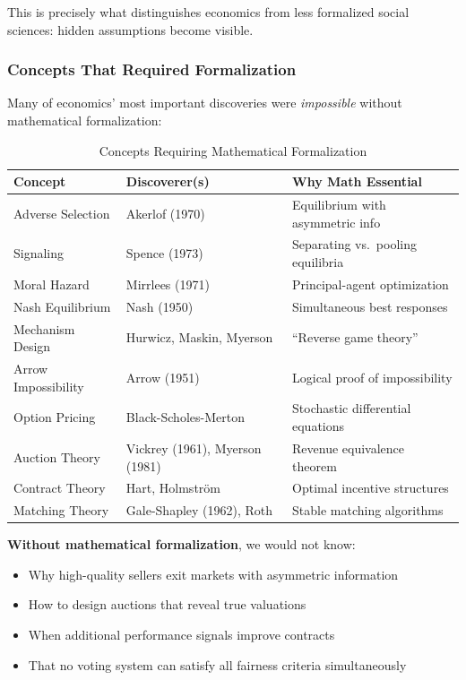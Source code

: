This is precisely what distinguishes economics from less formalized social sciences:
hidden assumptions become visible.

\subsubsection{Concepts That Required Formalization}

Many of economics' most important discoveries were \textit{impossible} without
mathematical formalization:

\begin{table}[htbp]
\centering
\caption{Concepts Requiring Mathematical Formalization}
\label{tab:formalization-required}
\renewcommand{\arraystretch}{1.3}
\small
\begin{tabular}{@{}lll@{}}
\toprule
\textbf{Concept} & \textbf{Discoverer(s)} & \textbf{Why Math Essential} \\
\midrule
Adverse Selection & Akerlof (1970) & Equilibrium with asymmetric info \\
Signaling & Spence (1973) & Separating vs.\ pooling equilibria \\
Moral Hazard & Mirrlees (1971) & Principal-agent optimization \\
Nash Equilibrium & Nash (1950) & Simultaneous best responses \\
Mechanism Design & Hurwicz, Maskin, Myerson & ``Reverse game theory'' \\
Arrow Impossibility & Arrow (1951) & Logical proof of impossibility \\
Option Pricing & Black-Scholes-Merton & Stochastic differential equations \\
Auction Theory & Vickrey (1961), Myerson (1981) & Revenue equivalence theorem \\
Contract Theory & Hart, Holmstr\"{o}m & Optimal incentive structures \\
Matching Theory & Gale-Shapley (1962), Roth & Stable matching algorithms \\
\bottomrule
\end{tabular}
\end{table}

\textbf{Without mathematical formalization}, we would not know:
\begin{itemize}[nosep]
    \item Why high-quality sellers exit markets with asymmetric information
    \item How to design auctions that reveal true valuations
    \item When additional performance signals improve contracts
    \item That no voting system can satisfy all fairness criteria simultaneously
\end{itemize}

